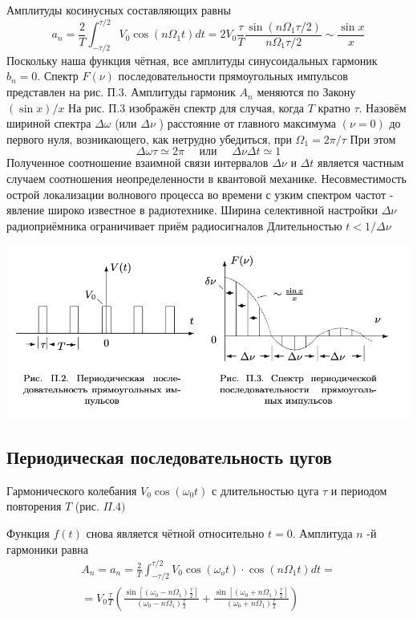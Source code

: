 \documentclass[a4paper,12pt]{article} %
\begin{document}
Амплитуды косинусных составляющих равны
$$
a_{n}=\frac{2}{T} \int_{-\tau / 2}^{\tau / 2} V_{0} \cos \left(n \Omega_{1} t\right) d t=2 V_{0} \frac{\tau}{T} \frac{\sin \left(n \Omega_{1} \tau / 2\right)}{n \Omega_{1} \tau / 2} \sim \frac{\sin x}{x}
$$
Поскольку наша функция чётная, все амплитуды синусоидальных гармоник $b_{n}=0 .$ Спектр $F(\nu)$ последовательности прямоугольных импульсов представлен на рис. П.3. Амплитуды гармоник $A_{n}$ меняются по Закону $(\sin x) / x$
На рис. П.3 изображён спектр для случая, когда $T$ кратно $\tau .$ Назовём шириной спектра $\Delta \omega$ (или $\Delta \nu$ ) расстояние от главного максимума $(\nu=0)$ до первого нуля, возникающего, как нетрудно убедиться, при $\Omega_{1}=2 \pi / \tau$ При этом
$$
\Delta \omega \tau \simeq 2 \pi \quad \text { или } \quad \Delta \nu \Delta t \simeq 1
$$
Полученное соотношение взаимной связи интервалов $\Delta \nu$ и $\Delta t$ является
частным случаем соотношения неопределенности в квантовой механике. Несовместимость острой локализации волнового процесса во времени с узким спектром частот - явление широко известное в радиотехнике. Ширина селективной настройки $\Delta \nu$ радиоприёмника ограничивает приём радиосигналов Длительностью $t<1 / \Delta \nu$

 \begin{center}
\includegraphics[width=0.7\linewidth]{2.jpeg}\\
\end{center}

\subsection{Периодическая последовательность цугов}
Гармонического колебания $V_{0} \cos \left(\omega_{0} t\right)$ с длительностью цуга $\tau$ и периодом повторения $T$ (рис. $\Pi .4)$
 
Функция $f(t)$ снова является чётной относительно $t=0 .$ Амплитуда $n$ -й гармоники равна
$$
\begin{array}{c}
A_{n}=a_{n}=\frac{2}{T} \int_{-\tau / 2}^{\tau / 2} V_{0} \cos \left(\omega_{o} t\right) \cdot \cos \left(n \Omega_{1} t\right) d t= \\
=V_{0} \frac{\tau}{T}\left(\frac{\sin \left[\left(\omega_{0}-n \Omega_{1}\right) \frac{\tau}{2}\right]}{\left(\omega_{0}-n \Omega_{1}\right) \frac{\tau}{2}}+\frac{\sin \left[\left(\omega_{0}+n \Omega_{1}\right) \frac{\tau}{2}\right]}{\left(\omega_{0}+n \Omega_{1}\right) \frac{\tau}{2}}\right)
\end{array}
$$
\end{document}
